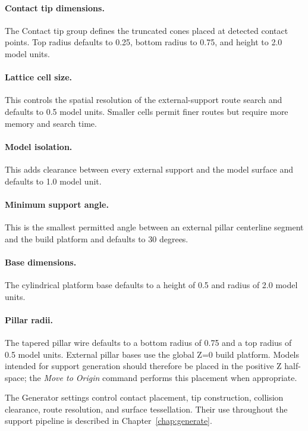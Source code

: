 \paragraph{Contact tip dimensions.}
The Contact tip group defines the truncated cones placed at detected contact
points. Top radius defaults to 0.25, bottom radius to 0.75, and height to 2.0
model units.

\paragraph{Lattice cell size.}
This controls the spatial resolution of the external-support route search and
defaults to 0.5 model units. Smaller cells permit finer routes but require more
memory and search time.

\paragraph{Model isolation.}
This adds clearance between every external support and the model surface and
defaults to 1.0 model unit.

\paragraph{Minimum support angle.}
This is the smallest permitted angle between an external pillar centerline
segment and the build platform and defaults to 30 degrees.

\paragraph{Base dimensions.}
The cylindrical platform base defaults to a height of 0.5 and radius of 2.0
model units.

\paragraph{Pillar radii.}
The tapered pillar wire defaults to a bottom radius of 0.75 and a top radius of
0.5 model units.
External pillar bases use the global Z=0 build platform. Models intended for
support generation should therefore be placed in the positive Z half-space;
the \emph{Move to Origin} command performs this placement when appropriate.

The Generator settings control contact placement, tip construction, collision
clearance, route resolution, and surface tessellation. Their use throughout
the support pipeline is described in Chapter~\ref{chap:generate}.

